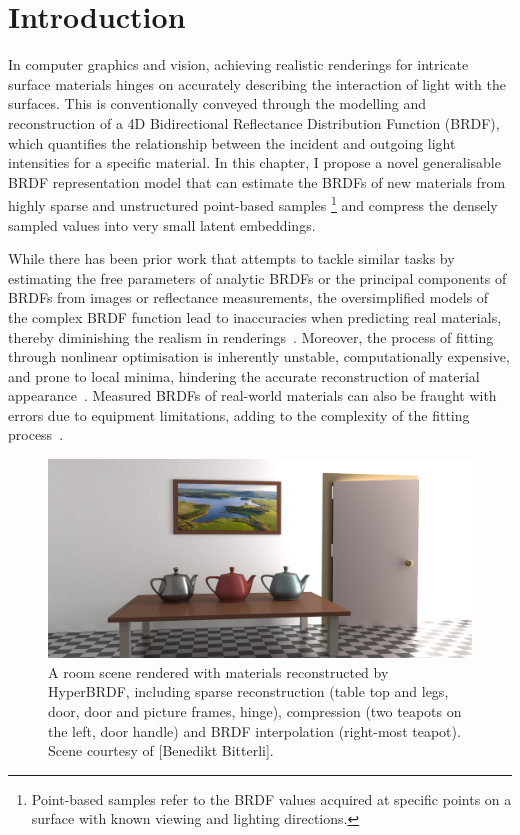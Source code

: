 \section{Introduction}
\label{sec:intro}


In computer graphics and vision, achieving realistic renderings for intricate surface materials hinges on accurately describing the interaction of light with the surfaces. This is conventionally conveyed through the modelling and reconstruction of a 4D Bidirectional Reflectance Distribution Function (BRDF), which quantifies the relationship between the incident and outgoing light intensities for a specific material. In this chapter, I propose a novel generalisable \gls{BRDF} representation model that can estimate the \gls{BRDF}s of new materials from highly sparse and unstructured point-based samples \footnote{Point-based samples refer to the \gls{BRDF} values acquired at specific points on a surface with known viewing and lighting directions.} and compress the densely sampled values into very small latent embeddings.


While there has been prior work that attempts to tackle similar tasks by estimating the free parameters of analytic \gls{BRDF}s or the principal components of \gls{BRDF}s from images or reflectance measurements, the oversimplified models of the complex \gls{BRDF} function lead to inaccuracies when predicting real materials, thereby diminishing the realism in renderings~\cite{ngan2005}. Moreover, the process of fitting through nonlinear optimisation is inherently unstable, computationally expensive, and prone to local minima, hindering the accurate reconstruction of material appearance~\cite{dupuy2015, guarnera2016}. Measured \gls{BRDF}s of real-world materials can also be fraught with errors due to equipment limitations, adding to the complexity of the fitting process~\cite{nielsen2015optimal}. 

\begin{figure}
  \centering
   \includegraphics[width=\linewidth]{Chapters/hyperbrdf-figs/teaser_cropped.png}
   \caption{A room scene rendered with materials reconstructed by HyperBRDF, including sparse reconstruction (table top and legs, door, door and picture frames, hinge), compression (two teapots on the left, door handle) and \gls{BRDF} interpolation (right-most teapot). Scene courtesy of [Benedikt Bitterli].}
   \label{fig:hyper-teaser}
\end{figure}

